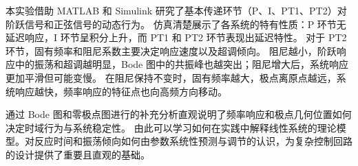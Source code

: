 本实验借助 MATLAB 和 Simulink 研究了基本传递环节（P、I、PT1、PT2）对阶跃信号和正弦信号的动态行为。
仿真清楚展示了各系统的特有性质：P 环节无延迟响应，I 环节呈积分上升，而 PT1 和 PT2 环节表现出延迟特性。
对于 PT2 环节，固有频率和阻尼系数主要决定响应速度以及超调倾向。
阻尼越小，阶跃响应中的振荡和超调越明显，Bode 图中的共振峰也越突出；阻尼增大后，系统响应更加平滑但可能变慢。
在阻尼保持不变时，固有频率越大，极点离原点越远，系统响应越快，频率响应的特征点也向高频方向移动。

通过 Bode 图和零极点图进行的补充分析直观说明了频率响应和极点几何位置如何决定时域行为与系统稳定性。
由此可以学习如何在实践中解释线性系统的理论模型。对反应时间和振荡倾向如何由参数系统性预测与调节的认识，为复杂控制回路的设计提供了重要且直观的基础。
